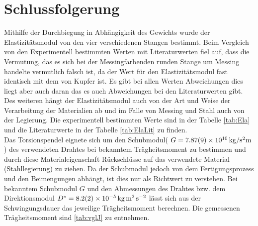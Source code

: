 
\section{Schlussfolgerung}



Mithilfe der Durchbiegung in Abhängigkeit des Gewichts wurde der Elastizitätsmodul von den vier verschiedenen Stangen bestimmt.
Beim Vergleich von den Experimentell bestimmten Werten mit Literaturwerten fiel auf, dass die Vermutung, das es sich bei der Messingfarbenden runden Stange um Messing handelte vermutlich falsch ist, da der Wert für den Elastizitätsmodul fast identisch mit dem von Kupfer ist. 
Es gibt bei allen Werten Abweichungen dies liegt aber auch daran das es auch Abweichungen bei den Literaturwerten gibt. Des weiteren hängt der Elastizitätsmodul auch von der Art und Weise der Verarbeitung der Materialien ab und im Falle von Messing und Stahl auch von der Legierung.
Die experimentell bestimmten Werte sind in der Tabelle \ref{tab:Ela} und die Literaturwerte in der Tabelle \ref{tab:ElaLit} zu finden.\\

Das Torsionspendel eignete sich um den Schubmodul( $G =\SI{7.87+-0.09e10}{kg \per \second \squared  \metre}$) des verwendeten Drahtes bei bekanntem Trägheitsmoment zu bestimmen und durch diese Materialeigenschaft Rückschlüsse auf das verwendete Material (Stahllegierung) zu ziehen. Da der Schubmodul jedoch von dem Fertigungsprozess und den Beimengungen abhängt, ist dies nur als Richtwert zu verstehen. Bei bekanntem Schubmodul $G$ und den Abmessungen des Drahtes bzw. dem Direktionsmodul $D^*=\SI{8.2+-0.2e-5}{\kilogram \metre \squared \per \second \squared }$  lässt sich aus der Schwingungsdauer das jeweilige Trägheitsmoment berechnen.  Die gemessenen  Trägheitsmoment  sind \cref{tab:vglJ} zu entnehmen.








